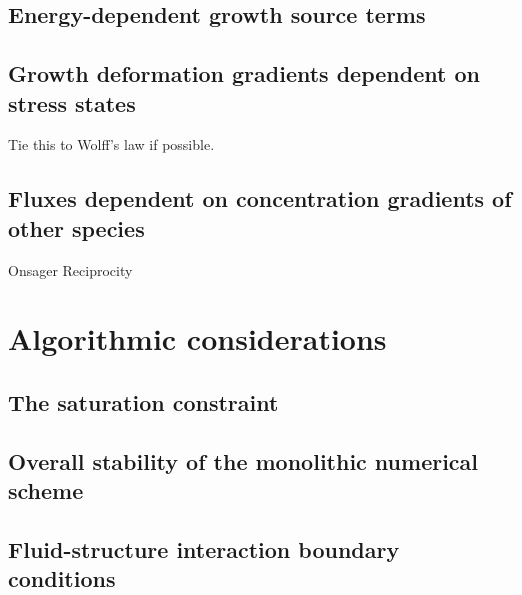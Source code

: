\subsection{Energy-dependent growth source terms}
\label{eu-energy-dependent-source}

\subsection{Growth deformation gradients dependent on stress states}
\label{eu-stress-dependent-source}
Tie this to Wolff's law if possible.


\subsection{Fluxes dependent on concentration gradients of other
  species}
\label{eu-onsager-reciprocity}
Onsager Reciprocity

\section{Algorithmic considerations}
\label{eu-algorithmic-considerations}
\subsection{The saturation constraint}
\subsection{Overall stability of the monolithic numerical scheme}
\subsection{Fluid-structure interaction boundary conditions}



